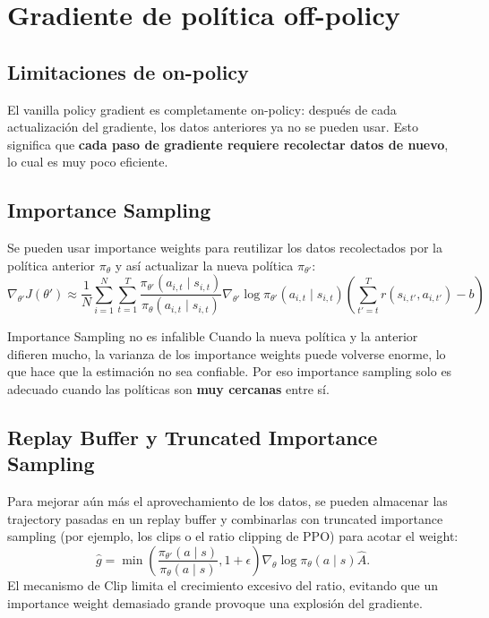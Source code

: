 \section{Gradiente de política off-policy}

\subsection{Limitaciones de on-policy}

El vanilla policy gradient es completamente on-policy: después de cada actualización del gradiente, los datos anteriores ya no se pueden usar. Esto significa que \textbf{cada paso de gradiente requiere recolectar datos de nuevo}, lo cual es muy poco eficiente.

\subsection{Importance Sampling}

Se pueden usar importance weights para reutilizar los datos recolectados por la política anterior $\pi_\theta$ y así actualizar la nueva política $\pi_{\theta'}$:
$$\nabla_{\theta'} J(\theta') \approx \frac{1}{N}\sum_{i=1}^{N}\sum_{t=1}^{T} \frac{\pi_{\theta'}(a_{i,t} \mid s_{i,t})}{\pi_\theta(a_{i,t} \mid s_{i,t})} \nabla_{\theta'} \log \pi_{\theta'}(a_{i,t} \mid s_{i,t}) \left(\sum_{t'=t}^{T} r(s_{i,t'}, a_{i,t'}) - b\right)$$

\begin{warningbox}{Importance Sampling no es infalible}
Cuando la nueva política y la anterior difieren mucho, la varianza de los importance weights puede volverse enorme, lo que hace que la estimación no sea confiable. Por eso importance sampling solo es adecuado cuando las políticas son \textbf{muy cercanas} entre sí.
\end{warningbox}

\subsection{Replay Buffer y Truncated Importance Sampling}
Para mejorar aún más el aprovechamiento de los datos, se pueden almacenar las trajectory pasadas en un replay buffer y combinarlas con truncated importance sampling (por ejemplo, los clips o el ratio clipping de PPO) para acotar el weight:
$$\hat{g} = \min\left(\frac{\pi_{\theta'}(a\mid s)}{\pi_\theta(a\mid s)}, 1+\epsilon\right) \nabla_\theta \log \pi_\theta(a\mid s) \hat{A}.$$
El mecanismo de Clip limita el crecimiento excesivo del ratio, evitando que un importance weight demasiado grande provoque una explosión del gradiente.

